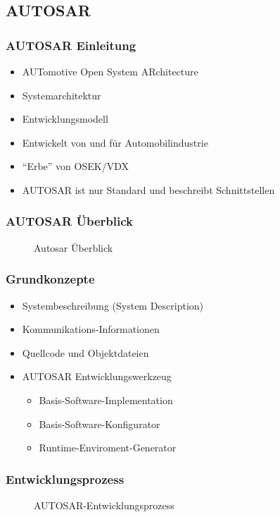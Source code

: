 \documentclass[]{beamer}
\newcommand{\inputImage}[1]{}
\begin{document}
\subsection{AUTOSAR}

\begin{frame}
\frametitle{AUTOSAR Einleitung}
    \begin{itemize}
        \item AUTomotive Open System ARchitecture
        \item Systemarchitektur
        \item Entwicklungsmodell
        \item Entwickelt von und für Automobilindustrie
        \item "`Erbe"' von OSEK/VDX
        \item AUTOSAR ist nur Standard und beschreibt Schnittstellen
    \end{itemize}
\end{frame}

\begin{frame}[plain]
\frametitle{AUTOSAR Überblick}
    \begin{figure}[p]
        \centering
        \resizebox{0.6\linewidth}{!}{\inputImage{autosar_overview.dia}}
        \caption{Autosar Überblick}
        \label{fig:autosar_overview}
    \end{figure}
\end{frame}

\begin{frame}
\frametitle{Grundkonzepte}
    \begin{itemize}
        \item Systembeschreibung (System Description)
        \item Kommunikations-Informationen
        \item Quellcode und Objektdateien
        \item AUTOSAR Entwicklungswerkzeug
        \begin{itemize}
            \item Basis-Software-Implementation
            \item Basis-Software-Konfigurator
            \item Runtime-Enviroment-Generator
        \end{itemize}
    \end{itemize}
\end{frame}

\begin{frame}
\frametitle{Entwicklungsprozess}
    \begin{figure}[ht]
        \centering
        \resizebox{0.98\linewidth}{!}{\inputImage{Autosar_Prozess.dia}}
        \caption{AUTOSAR-Entwicklungsprozess}
        \label{fig:autosar_prozess}
    \end{figure}
\end{frame}
\end{document}
